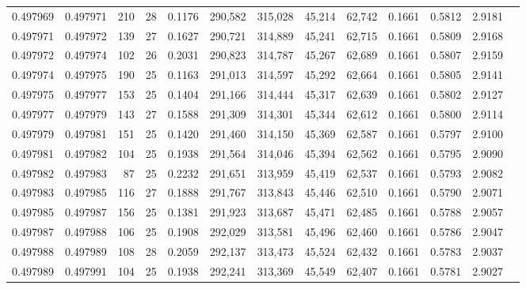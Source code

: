 \begin{tabular}{rrrrrrrrrrrrr}
0.497969 & 0.497971 & 210 &  28 &                                     0.1176 & 290,582 & 315,028 &  45,214 &  62,742 & 0.1661 & 0.5812 & 2.9181 \\
0.497971 & 0.497972 & 139 &  27 &                                     0.1627 & 290,721 & 314,889 &  45,241 &  62,715 & 0.1661 & 0.5809 & 2.9168 \\
0.497972 & 0.497974 & 102 &  26 &                                     0.2031 & 290,823 & 314,787 &  45,267 &  62,689 & 0.1661 & 0.5807 & 2.9159 \\
0.497974 & 0.497975 & 190 &  25 &                                     0.1163 & 291,013 & 314,597 &  45,292 &  62,664 & 0.1661 & 0.5805 & 2.9141 \\
0.497975 & 0.497977 & 153 &  25 &                                     0.1404 & 291,166 & 314,444 &  45,317 &  62,639 & 0.1661 & 0.5802 & 2.9127 \\
0.497977 & 0.497979 & 143 &  27 &                                     0.1588 & 291,309 & 314,301 &  45,344 &  62,612 & 0.1661 & 0.5800 & 2.9114 \\
0.497979 & 0.497981 & 151 &  25 &                                     0.1420 & 291,460 & 314,150 &  45,369 &  62,587 & 0.1661 & 0.5797 & 2.9100 \\
0.497981 & 0.497982 & 104 &  25 &                                     0.1938 & 291,564 & 314,046 &  45,394 &  62,562 & 0.1661 & 0.5795 & 2.9090 \\
0.497982 & 0.497983 &  87 &  25 &                                     0.2232 & 291,651 & 313,959 &  45,419 &  62,537 & 0.1661 & 0.5793 & 2.9082 \\
0.497983 & 0.497985 & 116 &  27 &                                     0.1888 & 291,767 & 313,843 &  45,446 &  62,510 & 0.1661 & 0.5790 & 2.9071 \\
0.497985 & 0.497987 & 156 &  25 &                                     0.1381 & 291,923 & 313,687 &  45,471 &  62,485 & 0.1661 & 0.5788 & 2.9057 \\
0.497987 & 0.497988 & 106 &  25 &                                     0.1908 & 292,029 & 313,581 &  45,496 &  62,460 & 0.1661 & 0.5786 & 2.9047 \\
0.497988 & 0.497989 & 108 &  28 &                                     0.2059 & 292,137 & 313,473 &  45,524 &  62,432 & 0.1661 & 0.5783 & 2.9037 \\
0.497989 & 0.497991 & 104 &  25 &                                     0.1938 & 292,241 & 313,369 &  45,549 &  62,407 & 0.1661 & 0.5781 & 2.9027 \\

\end{tabular}
